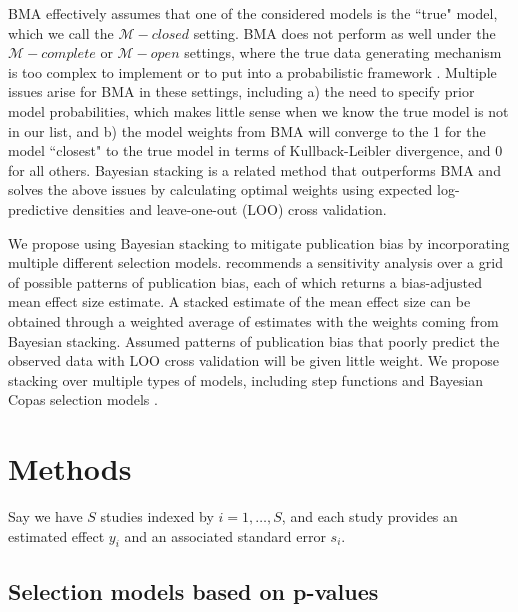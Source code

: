 \documentclass[12pt]{article}   	%
\numberwithin{equation}{section}
\begin{document}
BMA effectively assumes that one of the considered models is the ``true" model, which we call the $\mathcal{M}-closed$ setting. BMA does not perform as well under the $\mathcal{M}-complete$ or $\mathcal{M}-open$ settings, where the true data generating mechanism is too complex to implement or to put into a probabilistic framework \citep{clyde2013bma}. Multiple issues arise for BMA in these settings, including a) the need to specify prior model probabilities, which makes little sense when we know the true model is not in our list, and b) the model weights from BMA will converge to the  1 for the model ``closest" to the true model in terms of Kullback-Leibler divergence, and 0 for all others. Bayesian stacking \citep{yao2018stacking, yao2021hierarchical} is a related method that outperforms BMA and solves the above issues by calculating optimal weights using expected log-predictive densities and leave-one-out (LOO) cross validation. 

We propose using Bayesian stacking to mitigate publication bias by incorporating multiple different selection models. \citet{copas2001sensitivity} recommends a sensitivity analysis over a grid of possible patterns of publication bias, each of which returns a bias-adjusted mean effect size estimate. A stacked estimate of the mean effect size can be obtained through a weighted average of estimates with the weights coming from Bayesian stacking. Assumed patterns of publication bias that poorly predict the observed data with LOO cross validation will be given little weight. We propose stacking over multiple types of models, including step functions \citep{hedges1992selection, vevea1995pubbias} and Bayesian Copas selection models \citet{mavridis2013copas, bai2020}. 

\section{Methods} \label{sec:methods}

Say we have $S$ studies indexed by $i = 1, \dots, S$, and each study provides an estimated effect $y_i$ and an associated standard error $s_i$. 

\subsection{Selection models based on p-values} \label{sec:pvalue}
\end{document}
